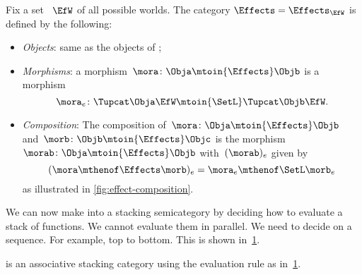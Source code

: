 \begin{definition}
    Fix a set ~$\EfW$ of all possible worlds.
    The category $\Effects=  \Effects_\EfW$ is defined by the following:
    \begin{itemize}
        \item \emph{Objects}: same as the objects of \SetL;
        \item \emph{Morphisms}: a morphism~$\mora\colon \Obja \mtoin{\Effects} \Objb$ is a morphism
              \begin{equation}
                  \mora_e\colon \Tupcat \Obja \EfW \mtoin{\SetL} \Tupcat \Objb \EfW.
              \end{equation}
        \item \emph{Composition}: The composition of~$\mora\colon \Obja \mtoin{\Effects} \Objb$ and~$\morb\colon \Objb \mtoin{\Effects} \Objc$ is the morphism~$\morab\colon \Obja \mtoin{\Effects} \Objb$ with~$(\morab)_e$ given by
              \begin{equation}
                  (\mora \mthenof \Effects \morb)
                  _e = \mora_e \mthenof\SetL \morb_e
              \end{equation}
              as illustrated in \cref{fig:effect-composition}.
    \end{itemize}
\end{definition}

We can now make \Effects into a stacking semicategory by deciding how to evaluate a stack of functions.
We cannot evaluate them in parallel.
We need to decide on a sequence.
For example, top to bottom.
This is shown in~\cref{fig:effect-stacking}.

\begin{lemma}
    \label{lem:effects-is-stacking}
    \Effects is an associative stacking category using the evaluation rule as in~\cref{fig:effect-stacking}.
\end{lemma}

\begin{figure}[h!]
    \centering
    \caption{}
    \label{fig:effect-stacking}
\end{figure}


